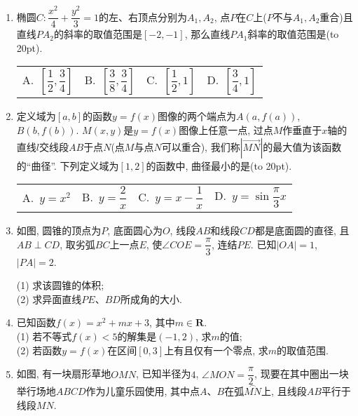 \documentclass[10pt,a4paper]{article}
\newcommand{\bracket}[1]{(\hbox to #1pt{})}
\newcommand{\fourch}[4]{\par\begin{tabular}{p{.23\textwidth}p{.23\textwidth}p{.23\textwidth}p{.23\textwidth}}
A.~#1 &B.~#2& C.~#3& D.~#4
\end{tabular}}
\begin{document}
\begin{enumerate}[1.]
\fourch{$\lg d$}{$\lg 2d$}{$\lg \dfrac 23$}{$\lg \dfrac 32$}
\item 椭圆$C:\dfrac{x^2}{4}+\dfrac{y^2}{3}=1$的左、右顶点分别为$A_1,A_2$, 点$P$在$C$上($P$不与$A_1,A_2$重合)且直线$PA_2$的斜率的取值范围是$[-2,-1]$, 那么直线$PA_1$斜率的取值范围是\bracket{20}.
\fourch{$[\dfrac 12,\dfrac 34]$}{$[\dfrac 38,\dfrac 34]$}{$[\dfrac 12, 1]$}{$[\dfrac 34,1]$}
\item 定义域为$[a,b]$的函数$y=f(x)$图像的两个端点为$A(a,f(a))$, $B(b,f(b))$. $M(x,y)$是$y=f(x)$图像上任意一点, 过点$M$作垂直于$x$轴的直线$l$交线段$AB$于点$N$(点$M$与点$N$可以重合), 我们称$|\overrightarrow{MN}|$的最大值为该函数的``曲径''. 下列定义域为$[1,2]$的函数中, 曲径最小的是\bracket{20}.
\fourch{$y=x^2$}{$y=\dfrac 2x$}{$y=x-\dfrac 1x$}{$y=\sin \dfrac\pi 3 x$}
\item 如图, 圆锥的顶点为$P$, 底面圆心为$O$, 线段$AB$和线段$CD$都是底面圆的直径, 且$AB\perp CD$, 取劣弧$BC$上一点$E$, 使$\angle COE=\dfrac\pi 3$, 连结$PE$. 已知$|OA|=1$, $|PA|=2$.
\begin{center}
\end{center}
(1) 求该圆锥的体积;\\
(2) 求异面直线$PE$、$BD$所成角的大小.
\item 已知函数$f(x)=x^2+mx+3$, 其中$m\in \mathbf{R}$.\\
(1) 若不等式$f(x)<5$的解集是$(-1,2)$, 求$m$的值;\\
(2) 若函数$y=f(x)$在区间$[0,3]$上有且仅有一个零点, 求$m$的取值范围.
\item 如图, 有一块扇形草地$OMN$, 已知半径为$4$, $\angle MON=\dfrac\pi 2$, 现要在其中圈出一块举行场地$ABCD$作为儿童乐园使用, 其中点$A$、$B$在弧$\overset\frown{MN}$上, 且线段$AB$平行于线段$MN$.
\begin{center}
\end{center}
\end{enumerate}
\end{document}
